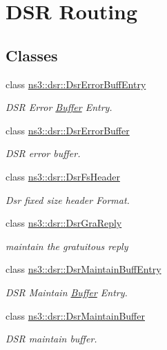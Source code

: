 \hypertarget{group__dsr}{}\section{D\+SR Routing}
\label{group__dsr}
\subsection*{Classes}
\begin{DoxyCompactItemize}
\item 
class \hyperlink{classns3_1_1dsr_1_1DsrErrorBuffEntry}{ns3\+::dsr\+::\+Dsr\+Error\+Buff\+Entry}
\begin{DoxyCompactList}\small\item\em D\+SR Error \hyperlink{classns3_1_1Buffer}{Buffer} Entry. \end{DoxyCompactList}\item 
class \hyperlink{classns3_1_1dsr_1_1DsrErrorBuffer}{ns3\+::dsr\+::\+Dsr\+Error\+Buffer}
\begin{DoxyCompactList}\small\item\em D\+SR error buffer. \end{DoxyCompactList}\item 
class \hyperlink{classns3_1_1dsr_1_1DsrFsHeader}{ns3\+::dsr\+::\+Dsr\+Fs\+Header}
\begin{DoxyCompactList}\small\item\em Dsr fixed size header Format. \end{DoxyCompactList}\item 
class \hyperlink{classns3_1_1dsr_1_1DsrGraReply}{ns3\+::dsr\+::\+Dsr\+Gra\+Reply}
\begin{DoxyCompactList}\small\item\em maintain the gratuitous reply \end{DoxyCompactList}\item 
class \hyperlink{classns3_1_1dsr_1_1DsrMaintainBuffEntry}{ns3\+::dsr\+::\+Dsr\+Maintain\+Buff\+Entry}
\begin{DoxyCompactList}\small\item\em D\+SR Maintain \hyperlink{classns3_1_1Buffer}{Buffer} Entry. \end{DoxyCompactList}\item 
class \hyperlink{classns3_1_1dsr_1_1DsrMaintainBuffer}{ns3\+::dsr\+::\+Dsr\+Maintain\+Buffer}
\begin{DoxyCompactList}\small\item\em D\+SR maintain buffer. \end{DoxyCompactList}\item 

\end{DoxyCompactItemize}
